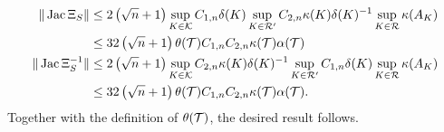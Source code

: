 \documentclass[a4paper]{article}
\begin{document}
        \begin{align*}
            \| \operatorname{{\rm Jac}} \Xi_{S} \| 
            &\leq 
            2 \left( \sqrt{n} + 1 \right) 
            \sup_{ K \in {\mathcal K}  }
            C_{1,n} {\delta}(K) 
            \sup_{ K \in {\mathcal R}' } 
            C_{2,n} \kappa(K) {\delta}(K)^{-1}
            \sup_{ K \in {\mathcal R}  } \kappa(A_{K})
            \\&\leq 
            32 \left( \sqrt{n} + 1 \right) 
            \theta({\mathcal T})
            C_{1,n} 
            C_{2,n} 
            \kappa({\mathcal T}) 
            \alpha({\mathcal T})
            \\
            \| \operatorname{{\rm Jac}} \Xi_{S}^{-1} \| 
            &\leq 
            2 \left( \sqrt{n} + 1 \right) 
            \sup_{ K \in {\mathcal K}  }
            C_{2,n} \kappa(K) {\delta}(K)^{-1}
            \sup_{ K \in {\mathcal R}' } 
            C_{1,n} {\delta}(K)
            \sup_{ K \in {\mathcal R}  } \kappa(A_{K})
            \\
            &\leq 
            32 \left( \sqrt{n} + 1 \right) 
            \theta({\mathcal T})
            C_{1,n} 
            C_{2,n} 
            \kappa({\mathcal T}) 
            \alpha({\mathcal T})
            .
        \end{align*}
        Together with the definition of $\theta({\mathcal T})$, the desired result follows. 
\end{document}
